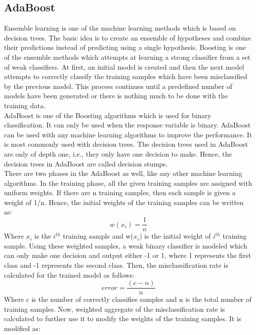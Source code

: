 \documentclass[sigconf]{acmart}
\begin{document}
\subsection{AdaBoost}
Ensemble learning is one of the machine learning methods which is based on decision trees. The basic idea is to create an ensemble of hypotheses and combine their predictions instead of predicting using a single hypothesis\cite{Brownlee2016}. Boosting is one of the ensemble methods which attempts at learning a strong classifier from a set of weak classifiers. At first, an initial model is created and then the next model attempts to correctly classify the training samples which have been misclassified by the previous model. This process continues until a predefined number of models have been generated or there is nothing much to be done with the training data. \\
AdaBoost is one of the Boosting algorithms which is used for binary classification. It can only be used when the response variable is binary. AdaBoost can be used with any machine learning algorithms to improve the performance. It is most commonly used with decision trees. The decision trees used in AdaBoost are only of depth one, i.e., they only have one decision to make. Hence, the decision trees in AdaBoost are called decision stumps\cite{Brownlee2016}. \\
There are two phases in the AdaBoost as well, like any other machine learning algorithms. In the training phase, all the given training samples are assigned with uniform weights. If there are n training samples, then each sample is given a weight of 1/n. Hence, the initial weights of the training samples can be written as\cite{Brownlee2016}:
\begin{equation}
    w(x_i) = \frac{1}{n}
\end{equation}
Where $x_i$ is the $i^{th}$ training sample and  w($x_i$) is the initial weight of $i^{th}$ training sample. Using these weighted samples, a weak binary classifier is modeled which can only make one decision and output either -1 or 1, where 1 represents the first class and -1 represents the second class. Then, the misclassification rate is calculated for the trained model as follows\cite{Brownlee2016}:
\begin{equation}
    error = \frac{(c-n)}{n}
\end{equation}
Where c is the number of correctly classifies samples and n is the total number of training samples. Now, weighted aggregate of the misclassification rate is calculated to further use it to modify the weights of the training samples. It is modified as\cite{Brownlee2016}:
\end{document}
